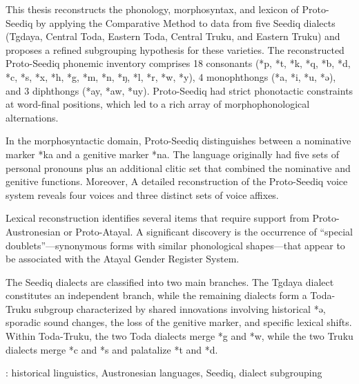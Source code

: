 \vspace{-1.25cm}
This thesis reconstructs the phonology, morphosyntax, and lexicon of Proto-Seediq by applying the Comparative Method to data from five Seediq dialects (Tgdaya, Central Toda, Eastern Toda, Central Truku, and Eastern Truku) and proposes a refined subgrouping hypothesis for these varieties. The reconstructed Proto-Seediq phonemic inventory comprises 18 consonants (*p, *t, *k, *q, *b, *d, *c, *s, *x, *h, *g, *m, *n, *ŋ, *l, *r, *w, *y), 4 monophthongs (*a, *i, *u, *ə), and 3 diphthongs (*ay, *aw, *uy). Proto-Seediq had strict phonotactic constraints at word-final positions, which led to a rich array of morphophonological alternations.

In the morphosyntactic domain, Proto-Seediq distinguishes between a nominative marker *ka and a genitive marker *na. The language originally had five sets of personal pronouns plus an additional clitic set that combined the nominative and genitive functions. Moreover, A detailed reconstruction of the Proto-Seediq voice system reveals four voices and three distinct sets of voice affixes.

Lexical reconstruction identifies several items that require support from Proto-Austronesian or Proto-Atayal. A significant discovery is the occurrence of ``special doublets''—synonymous forms with similar phonological shapes—that appear to be associated with the Atayal Gender Register System. 

The Seediq dialects are classified into two main branches. The Tgdaya dialect constitutes an independent branch, while the remaining dialects form a Toda-Truku subgroup characterized by shared innovations involving historical *ə, sporadic sound changes, the loss of the genitive marker, and specific lexical shifts. Within Toda-Truku, the two Toda dialects merge *g and *w, while the two Truku dialects merge *c and *s and palatalize *t and *d.

\noindent [Keywords]: historical linguistics, Austronesian languages, Seediq, dialect subgrouping





